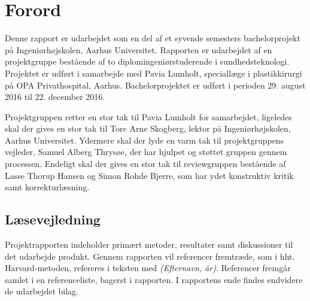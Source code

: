 \chapter*{Forord}

Denne rapport er udarbejdet som en del af et syvende semesters bachelorprojekt på Ingeniørhøjskolen, Aarhus Universitet. Rapporten er udarbejdet af en projektgruppe bestående af to diplomingeniørstuderende i sundhedsteknologi. Projektet er udført i samarbejde med Pavia Lumholt, speciallæge i plastikkirurgi på OPA Privathospital, Aarhus. 
Bachelorprojektet er udført i perioden 29. august 2016 til 22. december 2016. 

Projektgruppen retter en stor tak til Pavia Lumholt for samarbejdet, ligeledes skal der gives en stor tak til Tore Arne Skogberg, lektor på Ingeniørhøjskolen, Aarhus Universitet. Ydermere skal der lyde en varm tak til projektgruppens vejleder, Samuel Alberg Thrysøe, der har hjulpet og støttet gruppen gennem processen. Endeligt skal der gives en stor tak til reviewgruppen bestående af Lasse Thorup Hansen og Simon Rohde Bjerre, som har ydet konstruktiv kritik samt korrekturlæsning. 

\vspace{2cm}


\begin{centering}
\begin{multicols}{2}

\columnbreak
{}

\end{multicols}
\end{centering}

\vspace{1cm}

\section{Læsevejledning}
Projektrapporten indeholder primært metoder, resultater samt diskussioner til det udarbejde produkt. 
Gennem rapporten vil referencer fremtræde, som i hht. Harvard-metoden, refereres i teksten med \textit{(Efternavn, år)}. Referencer fremgår samlet i en referenceliste, bagerst i rapporten. I rapportens ende findes endvidere de udarbejdet bilag. 


 